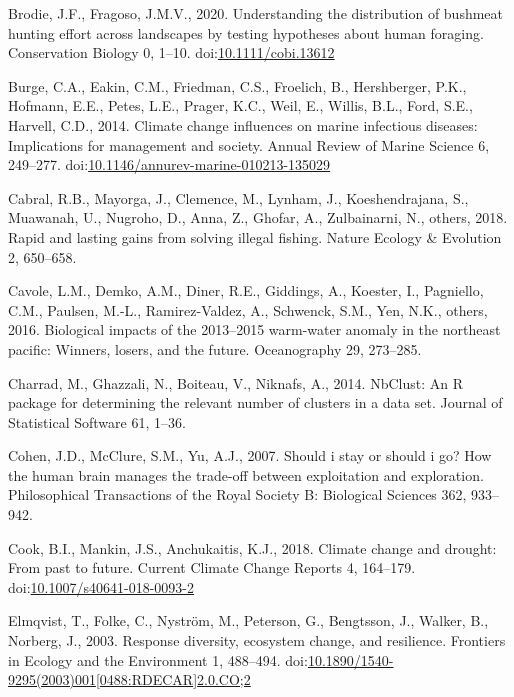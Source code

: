 \documentclass[]{elsarticle} %
\begin{document}
\leavevmode\hypertarget{ref-Brodie2020}{}%
Brodie, J.F., Fragoso, J.M.V., 2020. Understanding the distribution of
bushmeat hunting effort across landscapes by testing hypotheses about
human foraging. Conservation Biology 0, 1--10.
doi:\href{https://doi.org/10.1111/cobi.13612}{10.1111/cobi.13612}

\leavevmode\hypertarget{ref-Burge2014}{}%
Burge, C.A., Eakin, C.M., Friedman, C.S., Froelich, B., Hershberger,
P.K., Hofmann, E.E., Petes, L.E., Prager, K.C., Weil, E., Willis, B.L.,
Ford, S.E., Harvell, C.D., 2014. Climate change influences on marine
infectious diseases: Implications for management and society. Annual
Review of Marine Science 6, 249--277.
doi:\href{https://doi.org/10.1146/annurev-marine-010213-135029}{10.1146/annurev-marine-010213-135029}

\leavevmode\hypertarget{ref-Cabral2018}{}%
Cabral, R.B., Mayorga, J., Clemence, M., Lynham, J., Koeshendrajana, S.,
Muawanah, U., Nugroho, D., Anna, Z., Ghofar, A., Zulbainarni, N.,
others, 2018. Rapid and lasting gains from solving illegal fishing.
Nature Ecology \& Evolution 2, 650--658.

\leavevmode\hypertarget{ref-Cavole2016}{}%
Cavole, L.M., Demko, A.M., Diner, R.E., Giddings, A., Koester, I.,
Pagniello, C.M., Paulsen, M.-L., Ramirez-Valdez, A., Schwenck, S.M.,
Yen, N.K., others, 2016. Biological impacts of the 2013--2015 warm-water
anomaly in the northeast pacific: Winners, losers, and the future.
Oceanography 29, 273--285.

\leavevmode\hypertarget{ref-nbclust2014}{}%
Charrad, M., Ghazzali, N., Boiteau, V., Niknafs, A., 2014. NbClust: An R
package for determining the relevant number of clusters in a data set.
Journal of Statistical Software 61, 1--36.

\leavevmode\hypertarget{ref-Cohen2007}{}%
Cohen, J.D., McClure, S.M., Yu, A.J., 2007. Should i stay or should i
go? How the human brain manages the trade-off between exploitation and
exploration. Philosophical Transactions of the Royal Society B:
Biological Sciences 362, 933--942.

\leavevmode\hypertarget{ref-Cook2018}{}%
Cook, B.I., Mankin, J.S., Anchukaitis, K.J., 2018. Climate change and
drought: From past to future. Current Climate Change Reports 4,
164--179.
doi:\href{https://doi.org/10.1007/s40641-018-0093-2}{10.1007/s40641-018-0093-2}

\leavevmode\hypertarget{ref-Elmqvist2003a}{}%
Elmqvist, T., Folke, C., Nyström, M., Peterson, G., Bengtsson, J.,
Walker, B., Norberg, J., 2003. Response diversity, ecosystem change, and
resilience. Frontiers in Ecology and the Environment 1, 488--494.
doi:\href{https://doi.org/10.1890/1540-9295(2003)001\%5B0488:RDECAR\%5D2.0.CO;2}{10.1890/1540-9295(2003)001{[}0488:RDECAR{]}2.0.CO;2}
\end{document}
